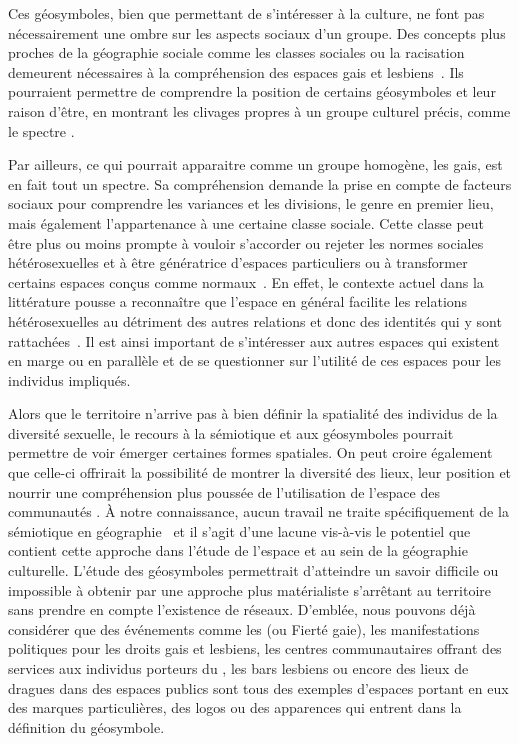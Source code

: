Ces géosymboles, bien que permettant de s'intéresser à la culture, ne font pas nécessairement une ombre sur les aspects sociaux d'un groupe. 
Des concepts plus proches de la géographie sociale comme les classes sociales ou la racisation~\citep{Bonniol2005} demeurent nécessaires à la compréhension des espaces gais et lesbiens~\citep[93]{Oswin2008}. 
Ils pourraient permettre de comprendre la position de certains géosymboles et leur raison d'être, en montrant les clivages propres à un groupe culturel précis, comme le spectre \lgbt{}.

Par ailleurs, ce qui pourrait apparaitre comme un groupe homogène, les gais, est en fait tout un spectre. 
Sa compréhension demande la prise en compte de facteurs sociaux pour comprendre les variances et les divisions, le genre en premier lieu, mais également l'appartenance à une certaine classe sociale.
Cette classe peut être plus ou moins prompte à vouloir s'accorder ou rejeter les normes sociales hétérosexuelles et à être génératrice d'espaces particuliers ou à transformer certains espaces conçus comme normaux~\citep{Lewis2011}. 
En effet, le contexte actuel dans la littérature pousse a reconnaître que l'espace en général facilite les relations hétérosexuelles au détriment des autres relations et donc des identités qui y sont rattachées~\citep{Brown2003}. 
Il est ainsi important de s'intéresser aux autres espaces qui existent en marge ou en parallèle et de se questionner sur l'utilité de ces espaces pour les individus impliqués.

Alors que le territoire n'arrive pas à bien définir la spatialité des individus de la diversité sexuelle, le recours à la sémiotique et aux géosymboles pourrait permettre de voir émerger certaines formes spatiales. 
On peut croire également que celle-ci offrirait la possibilité de montrer la diversité des lieux, leur position et nourrir une compréhension plus poussée de l'utilisation de l'espace des communautés \lgbt{}. 
À notre connaissance, aucun travail ne traite spécifiquement de la sémiotique en géographie \qu\ et il s'agit d'une lacune vis-à-vis le potentiel que contient cette approche dans l'étude de l'espace et au sein de la géographie culturelle.
L'étude des géosymboles permettrait d'atteindre un savoir difficile ou impossible à obtenir par une approche plus matérialiste s'arrêtant au territoire sans prendre en compte l'existence de réseaux. 
D'emblée, nous pouvons déjà considérer que des événements comme les  (ou Fierté gaie), les manifestations politiques pour les droits gais et lesbiens, les centres communautaires offrant des services aux individus porteurs du \vih, les bars lesbiens ou encore des lieux de dragues dans des espaces publics sont tous des exemples d'espaces \lgbt{} portant en eux des marques particulières, des logos ou des apparences qui entrent dans la définition du géosymbole.

